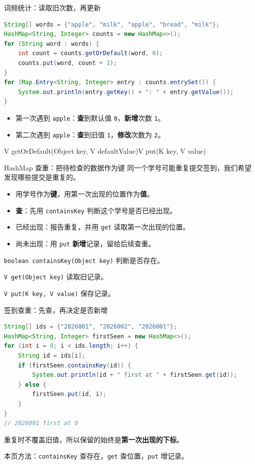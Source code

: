 \documentclass[aspectratio=169]{beamer}
\begin{document}
\begin{frame}[fragile]{词频统计：读取旧次数，再更新}
  \begin{lstlisting}[language=Java]
String[] words = {"apple", "milk", "apple", "bread", "milk"};
HashMap<String, Integer> counts = new HashMap<>();
for (String word : words) {
    int count = counts.getOrDefault(word, 0);
    counts.put(word, count + 1);
}
for (Map.Entry<String, Integer> entry : counts.entrySet()) {
    System.out.println(entry.getKey() + ": " + entry.getValue());
}
  \end{lstlisting}
  \begin{itemize}
    \item 第一次遇到 \texttt{apple}：\textbf{查}到默认值 \texttt{0}，\textbf{新增}次数 \texttt{1}。
    \item 第二次遇到 \texttt{apple}：\textbf{查}到旧值 \texttt{1}，\textbf{修改}次数为 \texttt{2}。
  \end{itemize}
  \medskip
  {\small\ttfamily V getOrDefault(Object key, V defaultValue)\quad V put(K key, V value)}
\end{frame}

\begin{frame}{HashMap 查重：把待检查的数据作为键}
  同一个学号可能重复提交签到，我们希望发现哪些提交是重复的。
  \par\bigskip
  \begin{itemize}
    \item 用学号作为\textbf{键}，用第一次出现的位置作为\textbf{值}。
    \item \textbf{查}：先用 \texttt{containsKey} 判断这个学号是否已经出现。
    \item 已经出现：报告重复，并用 \texttt{get} 读取第一次出现的位置。
    \item 尚未出现：用 \texttt{put} \textbf{新增}记录，留给后续查重。
  \end{itemize}
  \bigskip
  \texttt{boolean containsKey(Object key)} 判断是否存在。
  \par\medskip
  \texttt{V get(Object key)} 读取旧记录。
  \par
  \texttt{V put(K key, V value)} 保存记录。
\end{frame}

\begin{frame}[fragile]{签到查重：先查，再决定是否新增}
  \begin{lstlisting}[language=Java]
String[] ids = {"2026001", "2026002", "2026001"};
HashMap<String, Integer> firstSeen = new HashMap<>();
for (int i = 0; i < ids.length; i++) {
    String id = ids[i];
    if (firstSeen.containsKey(id)) {
        System.out.println(id + " first at " + firstSeen.get(id));
    } else {
        firstSeen.put(id, i);
    }
}
// 2026001 first at 0
  \end{lstlisting}
  重复时不覆盖旧值，所以保留的始终是\textbf{第一次出现的下标}。
  \par\medskip
  本页方法：\texttt{containsKey} 查存在，\texttt{get} 查位置，\texttt{put} 增记录。
\end{frame}
\end{document}
